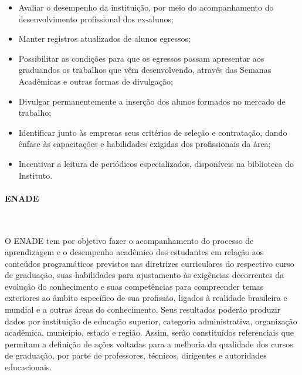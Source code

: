 \begin{itemize}
\item Avaliar o desempenho da instituição, por meio do acompanhamento do desenvolvimento profissional dos ex-alunos;

\item Manter registros atualizados de alunos egressos;

\item Possibilitar as condições para que os egressos possam apresentar aos graduandos os trabalhos que vêm desenvolvendo, através das Semanas Acadêmicas e outras formas de divulgação;

\item Divulgar permanentemente a inserção dos alunos formados no mercado de trabalho;

\item Identificar junto às empresas seus critérios de seleção e contratação, dando ênfase às capacitações e habilidades exigidas dos profissionais da área;

\item Incentivar a leitura de periódicos especializados, disponíveis na biblioteca do Instituto.
\end{itemize}

\paragraph{ENADE}\

  O ENADE tem por objetivo fazer o acompanhamento do processo de aprendizagem e o desempenho acadêmico dos estudantes em relação aos conteúdos programáticos previstos nas diretrizes curriculares do respectivo curso de graduação, suas habilidades para ajustamento às exigências decorrentes da evolução do conhecimento e suas competências para compreender temas exteriores ao âmbito específico de sua profissão, ligados à realidade brasileira e mundial e a outras áreas do conhecimento. Seus resultados poderão produzir dados por instituição de educação superior, categoria administrativa, organização acadêmica, município, estado e região. Assim, serão constituídos referenciais que permitam a definição de ações voltadas para a melhoria da qualidade dos cursos de graduação, por parte de professores, técnicos, dirigentes e autoridades educacionais. 



